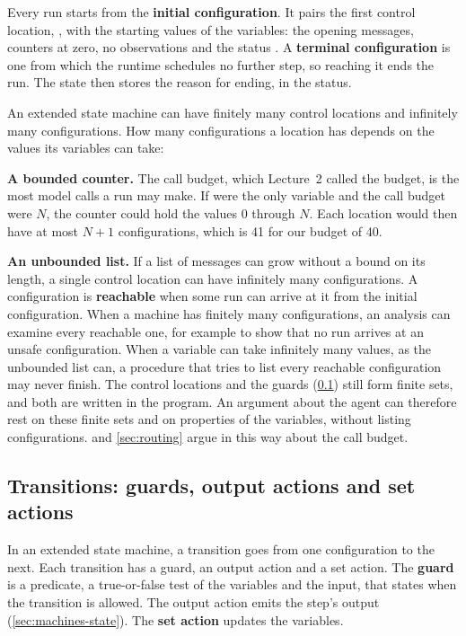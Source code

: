 Every run starts from the \textbf{initial configuration}. It pairs the first control location,
, with the starting values of the variables: the opening messages, counters at zero,
no observations and the status . A \textbf{terminal configuration} is one from which
the runtime schedules no further step, so reaching it ends the run. The state then stores the reason
for ending, in the status.

An extended state machine can have finitely many control locations and infinitely many
configurations. How many configurations a location has depends on the values its variables can
take:
\bi
\item \textbf{A bounded counter.} The call budget, which Lecture~2 called the budget, is the most
model calls a run may make. If  were the only variable and the call budget were
$N$, the counter could hold the values $0$ through $N$. Each location would then have at most $N+1$
configurations, which is 41 for our budget of 40.
\item \textbf{An unbounded list.} If a list of messages can grow without a bound on its length, a
single control location can have infinitely many configurations.
\ei
A configuration is \textbf{reachable} when some run can arrive at it from the initial configuration.
When a machine has finitely many configurations, an analysis can examine every reachable one, for
example to show that no run arrives at an unsafe configuration. When a variable can take infinitely
many values, as the unbounded list can, a procedure that tries to list every reachable configuration
may never finish. The control locations and the guards (\cref{sec:machines-transitions}) still form
finite sets, and both are written in the program. An argument about the agent can therefore rest on
these finite sets and on properties of the variables, without listing configurations.
 and \cref{sec:routing} argue in this way about the call budget.

\subsection{Transitions: guards, output actions and set actions}
\label{sec:machines-transitions}

In an extended state machine, a transition goes from one configuration to the next. Each transition
has a guard, an output action and a set action. The \textbf{guard} is a predicate, a true-or-false
test of the variables and the input, that states when the transition is allowed. The output action
emits the step's output (\cref{sec:machines-state}). The \textbf{set action} updates the variables.

